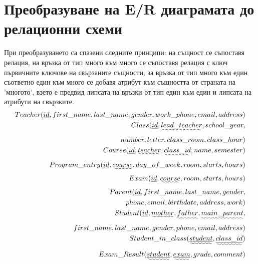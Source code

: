 \documentclass[a4paper, 12pt, x11names]{article}
\newcommand{\key}[1]{\underline{#1}}
\begin{document}
\restoregeometry{}

\section{Преобразуване на E/R диаграмата до релационни схеми}
При преобразуването са спазени следните принципи:
на същност се съпоставя релация,
на връзка от тип много към много се съпоставя релация с ключ първичните ключове на свързаните същности,
за връзка от тип много към един съответно един към много се добавя атрибут към същността от страната на 'многото',
взето е предвид липсата на връзки от тип един към един и липсата на атрибути на свързките.
\begin{align*}
    Teacher(\key{id}, first\_name, last\_name, gender, work\_phone, email, address)\\
    Class(\key{id}, \uwave{lead\_teacher}, school\_year, \\ number, letter, class\_room, class\_hour) \\
    Course(\key{id}, \uwave{teacher}, \uwave{class\_id}, name, semester)\\
    Program\_entry(\key{id}, \uwave{course}, day\_of\_week, room, starts, hours)\\
    Exam(\key{id}, \uwave{course}, room, starts, hours) \\
    Parent(\key{id}, first\_name, last\_name, gender, \\ phone, email, birthdate, address, work)\\
    Student(\key{id}, \uwave{mother}, \uwave{father}, \uwave{main\_parent}, \\
    first\_name, last\_name, gender, phone, email, address) \\
    Student\_in\_class(\uwave{\key{student}}, \uwave{\key{class\_id}}) \\
    Exam\_Result(\uwave{\key{student}}, \uwave{\key{exam}}, grade, comment)
\end{align*}
\end{document}
